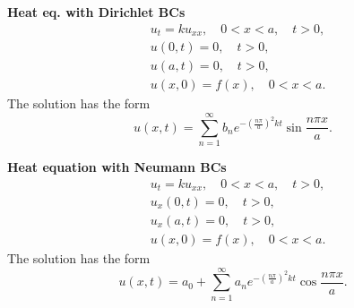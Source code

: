 \begin{minipage}{\linewidth}
    \begin{minipage}{0.5\linewidth}
        \textbf{Heat eq. with Dirichlet BCs}
        \[
        \begin{aligned}
            & u_{t} = k  u_{xx}, \quad 0<x<a , \quad t>0, \\
            & u(0,t)=0, \quad t>0,\\
            & u(a,t)=0, \quad t>0, \\
            & u(x,0)=f(x), \quad 0<x<a.
        \end{aligned}
        \]
        The solution has the form
        \[u(x,t)=\sum_{n=1}^{\infty} b_{n}e^{-\left(\frac{n\pi}{a}\right)^{2}kt}\sin \frac{n\pi x}{a}.\]
    \end{minipage}
    \begin{minipage}{0.5\linewidth}
        \textbf{Heat equation with Neumann BCs}
        \[
        \begin{aligned}
            & u_{t} = k  u_{xx}, \quad 0<x<a , \quad t>0, \\
            & u_{x}(0,t)=0, \quad t>0,\\
            & u_{x}(a,t)=0, \quad t>0, \\
            & u(x,0)=f(x), \quad 0<x<a.
        \end{aligned}
        \]
        The solution has the form
        \[u(x,t)=a_{0}+\sum_{n=1}^{\infty} a_{n}e^{-\left(\frac{n\pi}{a}\right)^{2}kt}\cos \frac{n\pi x}{a}.\]
    \end{minipage} \\
    

\end{minipage}
